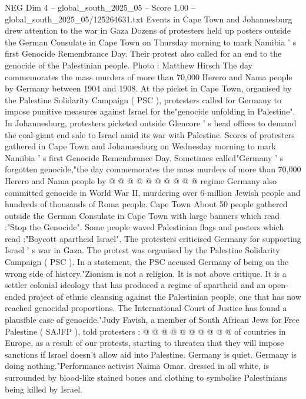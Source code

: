 \begin{textsample}{NEG Dim 4 – global\_south\_2025\_05 – Score 1.00 – global\_south\_2025\_05/125264631.txt}  \label{ex:f4_neg_365}
Events in Cape Town and Johannesburg drew attention to the war in Gaza Dozens of protesters held up posters outside the German Consulate in Cape Town on Thursday morning to mark Namibia ' s first Genocide Remembrance Day.
Their protest also called for an end to the genocide of the Palestinian people.
Photo : Matthew Hirsch The day commemorates the mass murders of more than 70,000 Herero and Nama people by Germany between 1904 and 1908.
At the picket in Cape Town, organised by the Palestine Solidarity Campaign ( PSC ), protesters called for Germany to impose punitive measures against Israel for the"genocide unfolding in Palestine".
In Johannesburg, protesters picketed outside Glencore ' s head offices to demand the coal-giant end sale to Israel amid its war with Palestine.
Scores of protesters gathered in Cape Town and Johannesburg on Wednesday morning to mark Namibia ' s first Genocide Remembrance Day.
Sometimes called"Germany ' s forgotten genocide,"the day commemorates the mass murders of more than 70,000 Herero and Nama people by @ @ @ @ @ @ @ @ @ @ regime Germany also committed genocide in World War II, murdering over 6-million Jewish people and hundreds of thousands of Roma people.
Cape Town About 50 people gathered outside the German Consulate in Cape Town with large banners which read :"Stop the Genocide".
Some people waved Palestinian flags and posters which read :"Boycott apartheid Israel".
The protesters criticised Germany for supporting Israel ' s war in Gaza.
The protest was organised by the Palestine Solidarity Campaign ( PSC ).
In a statement, the PSC accused Germany of being on the wrong side of history."Zionism is not a religion.
It is not above critique.
It is a settler colonial ideology that has produced a regime of apartheid and an open-ended project of ethnic cleansing against the Palestinian people, one that has now reached genocidal proportions.
The International Court of Justice has found a plausible case of genocide."Judy Favish, a member of South African Jews for Free Palestine ( SAJFP ), told protesters : @ @ @ @ @ @ @ @ @ @ of countries in Europe, as a result of our protests, starting to threaten that they will impose sanctions if Israel doesn't allow aid into Palestine.
Germany is quiet.
Germany is doing nothing."Performance activist Naima Omar, dressed in all white, is surrounded by blood-like stained bones and clothing to symbolise Palestinians being killed by Israel.

\end{textsample}

